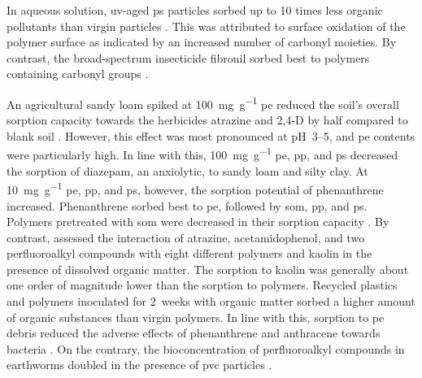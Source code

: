 In aqueous solution, \ac{uv}-aged \ac{ps} particles sorbed up to \num{10} times less organic pollutants than virgin particles \citep{HufferData2018,HufferSorption2018}. This was attributed to surface oxidation of the polymer surface as indicated by an increased number of carbonyl moieties. By contrast, the broad-spectrum insecticide fibronil sorbed best to polymers containing carbonyl groups \citep{GongComparative2019}.

An agricultural sandy loam spiked at \SI{100}{\milli\gram\per\gram} \ac{pe} reduced the soil's overall sorption capacity towards the herbicides atrazine and 2,4-D by half compared to blank soil \citep{HufferPolyethylene2019}. However, this effect was most pronounced at pH~\numrange{3}{5}, and \ac{pe} contents were particularly high. In line with this, \SI{100}{\milli\gram\per\gram} \ac{pe}, \ac{pp}, and \ac{ps} decreased the sorption of diazepam, an anxiolytic, to sandy loam and silty clay. At \SI{10}{\milli\gram\per\gram} \ac{pe}, \ac{pp}, and \ac{ps}, however, the sorption potential of phenanthrene increased. Phenanthrene sorbed best to \ac{pe}, followed by \ac{som}, \ac{pp}, and \ac{ps}. Polymers pretreated with \ac{som} were decreased in their sorption capacity \citep{XuContrasting2021}.
By contrast, \citet{AteiaSorption2020} assessed the interaction of atrazine, acetamidophenol, and two perfluoroalkyl compounds with eight different polymers and kaolin in the presence of dissolved organic matter. The sorption to kaolin was generally about one order of magnitude lower than the sorption to polymers. Recycled plastics and polymers inoculated for \num{2}~weeks with organic matter sorbed a higher amount of organic substances than virgin polymers.
In line with this, sorption to \ac{pe} debris reduced the adverse effects of phenanthrene and anthracene towards bacteria \citep{KleinteichMicroplastics2018}. On the contrary, the bioconcentration of perfluoroalkyl compounds in earthworms doubled in the presence of \ac{pvc} particles \citep{SobhaniMicroplastics2021}.

